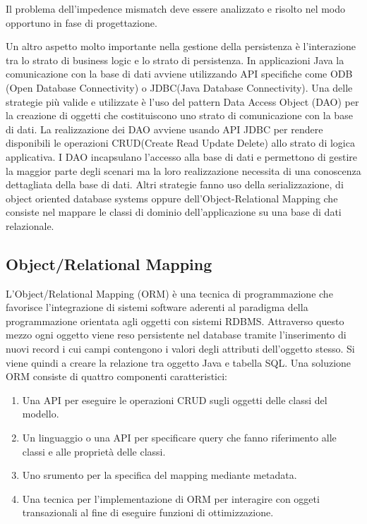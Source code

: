 Il problema dell'impedence mismatch deve essere analizzato e risolto nel modo opportuno in fase di progettazione. 

Un altro aspetto molto importante nella gestione della persistenza \`e l'interazione tra lo strato di business logic e lo strato di persistenza.
In applicazioni Java la comunicazione con la base di dati avviene utilizzando API specifiche come ODB (Open Database Connectivity) o JDBC(Java Database Connectivity). 
Una delle strategie pi\`u valide e utilizzate \`e l'uso del pattern Data Access Object (DAO) per la creazione di oggetti che costituiscono uno strato di comunicazione con la base di dati. 
La realizzazione dei DAO avviene usando API JDBC
per rendere disponibili le operazioni CRUD(Create Read Update Delete) allo strato di logica applicativa. I DAO incapsulano l'accesso alla base di dati e permettono di gestire la maggior parte degli scenari ma la loro realizzazione necessita di una conoscenza dettagliata della base di dati.
Altri strategie fanno uso della serializzazione, di object oriented database systems oppure dell'Object-Relational Mapping che consiste nel mappare le classi di dominio dell'applicazione su una base di dati relazionale. 

\subsection{Object/Relational Mapping}
L'Object/Relational Mapping (ORM) \`e una tecnica di programmazione che favorisce l'integrazione di sistemi software aderenti al paradigma della programmazione orientata agli oggetti con sistemi RDBMS.
Attraverso questo mezzo ogni oggetto viene reso persistente nel database tramite l'inserimento di nuovi record i cui campi contengono i valori degli attributi dell'oggetto stesso. Si viene quindi a creare la relazione tra oggetto Java e tabella SQL. Una soluzione ORM consiste di quattro componenti caratteristici:

\begin{enumerate}
\item Una API per eseguire le operazioni CRUD sugli oggetti delle classi del modello.
\item  Un linguaggio  o una API  per specificare query che fanno riferimento alle classi e alle propriet\`a delle classi.
\item Uno srumento per la specifica del mapping mediante metadata.
\item Una tecnica per l'implementazione di ORM  per interagire con oggeti transazionali al fine di eseguire funzioni di ottimizzazione.
\end{enumerate}


